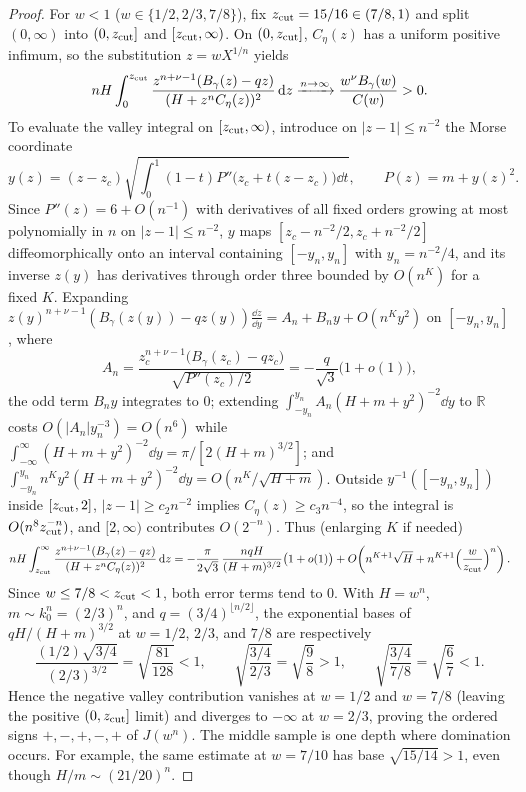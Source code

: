 \begin{proof}
For $w<1$ ($w\in\{1/2,2/3,7/8\}$), fix $z_{\rm cut}=15/16\in(7/8,1)$ and split $(0,\infty)$ into $(0,z_{\rm cut}]$ and
$[z_{\rm cut},\infty)$. On $(0,z_{\rm cut}]$, $C_\eta(z)$ has a uniform positive infimum, so the substitution $z=wX^{1/n}$
yields
\[
  nH\int_0^{z_{\rm cut}} \frac{z^{n+\nu-1}(B_\gamma(z)-qz)}{(H+z^n C_\eta(z))^2}\,\mathrm{d} z \xrightarrow{n\to\infty} \frac{w^\nu B_\gamma(w)}{C(w)} > 0.
\]
To evaluate the valley integral on $[z_{\rm cut},\infty)$, introduce on $|z-1|\le n^{-2}$ the Morse coordinate
\[
  y(z) = (z-z_c)\sqrt{\int_0^1 (1-t)P''\bigl(z_c+t(z-z_c)\bigr)\dd t}, \qquad P(z) = m + y(z)^2.
\]
Since $P''(z)=6+O(n^{-1})$ with derivatives of all fixed orders growing at most polynomially in $n$ on
$|z-1|\le n^{-2}$, $y$ maps $[z_c-n^{-2}/2,z_c+n^{-2}/2]$ diffeomorphically onto an interval
containing $[-y_n,y_n]$ with $y_n=n^{-2}/4$, and its inverse $z(y)$ has derivatives through order
three bounded by $O(n^K)$ for a fixed $K$. Expanding $z(y)^{n+\nu-1}(B_\gamma(z(y))-qz(y))\frac{\dd
z}{\dd y} = A_n + B_n y + O(n^K y^2)$ on $[-y_n,y_n]$, where
\[
  A_n = \frac{z_c^{n+\nu-1}\bigl(B_\gamma(z_c)-qz_c\bigr)}{\sqrt{P''(z_c)/2}} = -\frac{q}{\sqrt{3}}\bigl(1+o(1)\bigr),
\]
the odd term $B_n y$ integrates to $0$; extending $\int_{-y_n}^{y_n} A_n(H+m+y^2)^{-2}\dd y$ to
$\mathbb{R}$ costs $O(|A_n|y_n^{-3})=O(n^6)$ while $\int_{-\infty}^\infty (H+m+y^2)^{-2}\dd
y=\pi/[2(H+m)^{3/2}]$; and $\int_{-y_n}^{y_n} n^K y^2(H+m+y^2)^{-2}\dd y = O(n^K/\sqrt{H+m})$. Outside
$y^{-1}([-y_n,y_n])$ inside $[z_{\rm cut},2]$, $|z-1|\ge c_2 n^{-2}$ implies $C_\eta(z)\ge c_3 n^{-4}$, so the
integral is $O(n^8 z_{\rm cut}^{-n})$, and $[2,\infty)$ contributes $O(2^{-n})$. Thus (enlarging $K$ if needed)
\[
  nH\int_{z_{\rm cut}}^\infty \frac{z^{n+\nu-1}(B_\gamma(z)-qz)}{(H+z^n C_\eta(z))^2}\,\mathrm{d} z =
  -\frac{\pi}{2\sqrt{3}}\,\frac{n q H}{(H+m)^{3/2}}\bigl(1+o(1)\bigr) + O\!\left(n^{K+1}\sqrt{H} +
  n^{K+1}\Bigl(\frac{w}{z_{\rm cut}}\Bigr)^n\right).
\]
Since $w\le 7/8<z_{\rm cut}<1$, both error terms tend to $0$. With $H=w^n$, $m\sim k_0^n=(2/3)^n$, and
$q=(3/4)^{\lfloor n/2\rfloor}$, the exponential bases of $qH/(H+m)^{3/2}$ at $w=1/2$, $2/3$, and $7/8$
are respectively
\[
  \frac{(1/2)\sqrt{3/4}}{(2/3)^{3/2}} = \sqrt{\frac{81}{128}} < 1, \qquad \sqrt{\frac{3/4}{2/3}} =
  \sqrt{\frac{9}{8}} > 1, \qquad \sqrt{\frac{3/4}{7/8}} = \sqrt{\frac{6}{7}} < 1.
\]
Hence the negative valley contribution vanishes at $w=1/2$ and $w=7/8$ (leaving the positive $(0,z_{\rm cut}]$
limit) and diverges to $-\infty$ at $w=2/3$, proving the ordered signs $+,-,+,-,+$ of $J(w^n)$.
The middle sample is one depth where domination occurs. For example,
the same estimate at $w=7/10$ has base $\sqrt{15/14}>1$, even though
$H/m\sim(21/20)^n$.
\end{proof}
